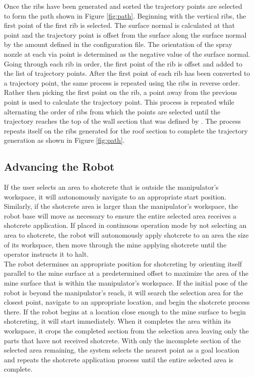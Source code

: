 Once the ribs have been generated and sorted the trajectory points are selected to form the path shown in Figure \ref{fig:path}. Beginning with the vertical ribs, the first point of the first rib is selected. The surface normal is calculated at that point and the trajectory point is offset from the surface along the surface normal by the  amount defined in the configuration file. The orientation of the spray nozzle at each via point is determined as the negative value of the surface normal. Going through each rib in order, the first point of the rib is offset and added to the list of trajectory points. After the first point of each rib has been converted to a trajectory point, the same process is repeated using the ribs in reverse order. Rather then picking the first point on the rib, a point  away from the previous point is used to calculate the trajectory point. This process is repeated while alternating the order of ribs from which the points are selected until the trajectory reaches the top of the wall section that was defined by . The process repeats itself on the ribs generated for the roof section to complete the trajectory generation as shown in Figure \ref{fig:path}.\\

\subsection{Advancing the Robot}

If the user selects an area to shotcrete that is outside the manipulator's workspace, it will autonomously navigate to an appropriate start position. Similarly, if the shotcrete area is larger than the manipulator's workspace, the robot base will move as necessary to ensure the entire selected area receives a shotcrete application. If placed in continuous operation mode by not selecting an area to shotcrete, the robot will autonomously apply shotcrete to an area the size of its workspace, then move through the mine applying shotcrete until the operator instructs it to halt.\\

The robot determines an appropriate position for shotcreting by orienting itself parallel to the mine surface at a predetermined offset to maximize the area of the mine surface that is within the manipulator's workspace. If the initial pose of the robot is beyond the manipulator's reach, it will search the selection area for the closest point, navigate to an appropriate location, and begin the shotcrete process there. If the robot begins at a location close enough to the mine surface to begin shotcreting, it will start immediately. When it completes the area within its workspace, it crops the completed section from the selection area leaving only the parts that have not received shotcrete. With only the incomplete section of the selected area remaining, the system selects the nearest point as a goal location and repeats the shotcrete application process until the entire selected area is complete.\\

